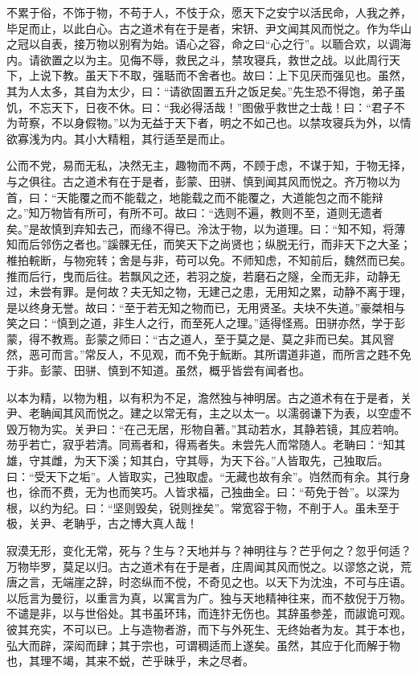 \documentclass[]{article}
\begin{document}
不累于俗，不饰于物，不苟于人，不忮于众，愿天下之安宁以活民命，人我之养，毕足而止，以此白心。古之道术有在于是者，宋钘、尹文闻其风而悦之。作为华山之冠以自表，接万物以别宥为始。语心之容，命之曰``心之行''。以聏合欢，以调海内。请欲置之以为主。见侮不辱，救民之斗，禁攻寝兵，救世之战。以此周行天下，上说下教。虽天下不取，强聒而不舍者也。故曰：上下见厌而强见也。虽然，其为人太多，其自为太少，曰：``请欲固置五升之饭足矣。''先生恐不得饱，弟子虽饥，不忘天下，日夜不休。曰：``我必得活哉！''图傲乎救世之士哉！曰：``君子不为苛察，不以身假物。''以为无益于天下者，明之不如己也。以禁攻寝兵为外，以情欲寡浅为内。其小大精粗，其行适至是而止。

公而不党，易而无私，决然无主，趣物而不两，不顾于虑，不谋于知，于物无择，与之俱往。古之道术有在于是者，彭蒙、田骈、慎到闻其风而悦之。齐万物以为首，曰：``天能覆之而不能载之，地能载之而不能覆之，大道能包之而不能辩之。''知万物皆有所可，有所不可。故曰：``选则不遍，教则不至，道则无遗者矣。''是故慎到弃知去己，而缘不得已。泠汰于物，以为道理。曰：``知不知，将薄知而后邻伤之者也。''謑髁无任，而笑天下之尚贤也；纵脱无行，而非天下之大圣；椎拍輐断，与物宛转；舍是与非，苟可以免。不师知虑，不知前后，魏然而已矣。推而后行，曳而后往。若飘风之还，若羽之旋，若磨石之隧，全而无非，动静无过，未尝有罪。是何故？夫无知之物，无建己之患，无用知之累，动静不离于理，是以终身无誉。故曰：``至于若无知之物而已，无用贤圣。夫块不失道。''豪桀相与笑之曰：``慎到之道，非生人之行，而至死人之理。''适得怪焉。田骈亦然，学于彭蒙，得不教焉。彭蒙之师曰：``古之道人，至于莫之是、莫之非而已矣。其风窨然，恶可而言。''常反人，不见观，而不免于魭断。其所谓道非道，而所言之韪不免于非。彭蒙、田骈、慎到不知道。虽然，概乎皆尝有闻者也。

以本为精，以物为粗，以有积为不足，澹然独与神明居。古之道术有在于是者，关尹、老聃闻其风而悦之。建之以常无有，主之以太一。以濡弱谦下为表，以空虚不毁万物为实。关尹曰：``在己无居，形物自著。''其动若水，其静若镜，其应若响。芴乎若亡，寂乎若清。同焉者和，得焉者失。未尝先人而常随人。老聃曰：``知其雄，守其雌，为天下溪；知其白，守其辱，为天下谷。''人皆取先，己独取后。曰：``受天下之垢''。人皆取实，己独取虚。``无藏也故有余''。岿然而有余。其行身也，徐而不费，无为也而笑巧。人皆求福，己独曲全。曰：``苟免于咎''。以深为根，以约为纪。曰：``坚则毁矣，锐则挫矣''。常宽容于物，不削于人。虽未至于极，关尹、老聃乎，古之博大真人哉！

寂漠无形，变化无常，死与？生与？天地并与？神明往与？芒乎何之？忽乎何适？万物毕罗，莫足以归。古之道术有在于是者，庄周闻其风而悦之。以谬悠之说，荒唐之言，无端崖之辞，时恣纵而不傥，不奇见之也。以天下为沈浊，不可与庄语。以卮言为曼衍，以重言为真，以寓言为广。独与天地精神往来，而不敖倪于万物。不谴是非，以与世俗处。其书虽环玮，而连犿无伤也。其辞虽参差，而諔诡可观。彼其充实，不可以已。上与造物者游，而下与外死生、无终始者为友。其于本也，弘大而辟，深闳而肆；其于宗也，可谓稠适而上遂矣。虽然，其应于化而解于物也，其理不竭，其来不蜕，芒乎昧乎，未之尽者。
\end{document}
